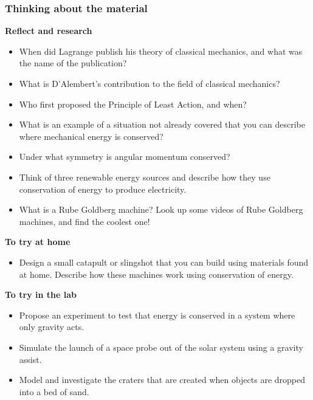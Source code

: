 \subsubsection{Thinking about the material}

\begin{framed}
\textbf{Reflect and research}\\
\begin{itemize}
\item When did Lagrange publish his theory of classical mechanics, and what was the name of the publication?
\item What is D'Alembert's contribution to the field of classical mechanics?
\item Who first proposed the Principle of Least Action, and when?
\item What is an example of a situation not already covered that you can describe where mechanical energy is conserved?
\item Under what symmetry is angular momentum conserved?
\item Think of three renewable energy sources and describe how they use conservation of energy to produce electricity.
\item What is a Rube Goldberg machine? Look up some videos of Rube Goldberg machines, and find the coolest one!
\end{itemize}
\end{framed}

\begin{framed}
\textbf{To try at home}\\
\begin{itemize}
\item Design a small catapult or slingshot that you can build using materials found at home. Describe how these machines work using conservation of energy.
\end{itemize}
\end{framed}

\begin{framed}
\textbf{To try in the lab}\\
\begin{itemize}
\item Propose an experiment to test that energy is conserved in a system where only gravity acts.
\item Simulate the launch of a space probe out of the solar system using a gravity assist.
\item Model and investigate the craters that are created when objects are dropped into a bed of sand.
\end{itemize}
\end{framed}

